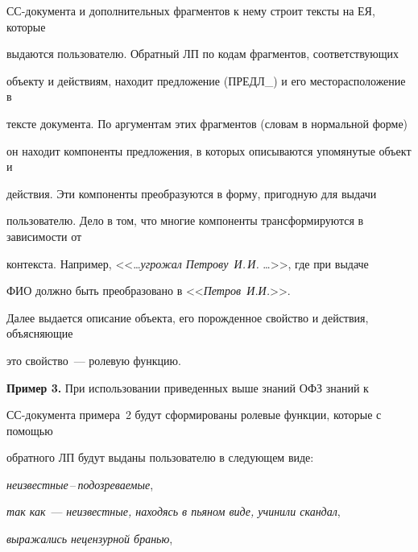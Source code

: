 СС-документа и дополнительных фрагментов к нему строит тексты на ЕЯ, которые 


выдаются пользователю. Обратный ЛП по кодам фрагментов, соответствующих 


объекту и действиям, находит предложение (ПРЕДЛ\_) и его месторасположение в 


тексте документа. По аргументам этих фрагментов (словам в нормальной форме) 


он находит компоненты предложения, в которых описываются упомянутые объект и 


действия. Эти компоненты преобразуются в форму, пригодную для выдачи 


пользователю. Дело в том, что многие компоненты трансформируются в зависимости от 


контекста. Например, <<\ldots\textit{угрожал Петрову~И.\,И.} \ldots>>,  где при выдаче 


ФИО должно быть преобразовано в <<\textit{Петров~И.И.}>>.





Далее выдается описание объекта, его порожденное свойство и действия, объясняющие 


это свойство~--- ролевую функцию.       


     


\medskip





\noindent


\textbf{Пример 3.} При использовании приведенных выше знаний ОФЗ знаний к 


СС-до\-ку\-мента примера~2 будут сформированы ролевые функции, которые с помощью 


обратного ЛП будут выданы пользователю в следующем виде:  





\textit{неизвестные}\,--\,\textit{подозреваемые},





\textit{так как}~--- \textit{неизвестные, находясь в пьяном виде, учинили скандал},





\textit{выражались нецензурной бранью},





